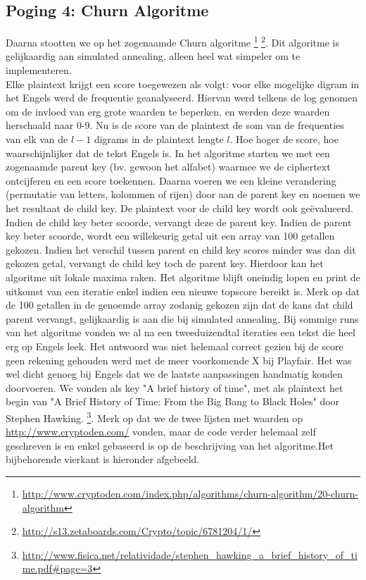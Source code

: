 \subsection{Poging 4: Churn Algoritme}
Daarna stootten we op het zogenaamde Churn algoritme \footnote{\url{http://www.cryptoden.com/index.php/algorithms/churn-algorithm/20-churn-algorithm}} \footnote{\url{http://s13.zetaboards.com/Crypto/topic/6781204/1/}}. Dit algoritme is gelijkaardig aan simulated annealing, alleen heel wat simpeler om te implementeren. \\ 
Elke plaintext krijgt een score toegewezen als volgt: voor elke mogelijke digram in het Engels werd de frequentie geanalyseerd. Hiervan werd telkens de log genomen om de invloed van erg grote waarden te beperken, en werden deze waarden herschaald naar 0-9. Nu is de score van de plaintext de som van de frequenties van elk van de $l-1$ digrams in de plaintext lengte $l$. Hoe hoger de score, hoe waarschijnlijker dat de tekst Engels is. In het algoritme starten we met een zogenaamde parent key (bv. gewoon het alfabet) waarmee we de ciphertext ontcijferen en een score toekennen. Daarna voeren we een kleine verandering (permutatie van letters, kolommen of \mbox{rijen}) door aan de parent key en noemen we het resultaat de child key. De plaintext voor de child key wordt ook ge\"evalueerd. Indien de child key beter scoorde, vervangt deze de parent key. Indien de parent key beter scoorde, wordt een willekeurig getal uit een array van 100 getallen gekozen. Indien het verschil tussen parent en child key scores minder was dan dit gekozen getal, vervangt de child key toch de parent key. Hierdoor kan het algoritme uit lokale maxima raken. Het algoritme blijft oneindig lopen en print de uitkomst van een iteratie enkel indien een nieuwe topscore bereikt is. Merk op dat de 100 getallen in de genoemde array zodanig gekozen zijn dat de kans dat child parent vervangt, gelijkaardig is aan die bij simulated annealing. Bij sommige runs van het algoritme vonden we al na een tweeduizendtal iteraties een tekst die heel erg op Engels leek. Het antwoord was niet helemaal correct gezien bij de score geen rekening gehouden werd met de meer voorkomende X bij Playfair. Het was wel dicht genoeg bij Engels dat we de laatste aanpassingen handmatig konden doorvoeren. We vonden als key "A brief history of time", met als plaintext het begin van "A Brief History of Time: From the Big Bang to Black Holes" door Stephen Hawking. \footnote{\url{http://www.fisica.net/relatividade/stephen_hawking_a_brief_history_of_time.pdf\#page=3}}. Merk op dat we de twee lijsten met waarden op \url{http://www.cryptoden.com/} vonden, maar de code verder helemaal zelf geschreven is en enkel gebaseerd is op de beschrijving van het algoritme.Het bijbehorende vierkant is hieronder afgebeeld.   \\

